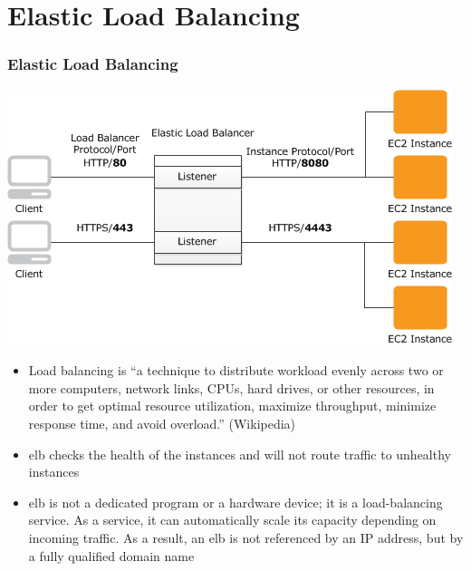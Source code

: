 \documentclass{beamer}
\begin{document}
\section{Elastic Load Balancing}
\begin{frame}
\frametitle{Elastic Load Balancing}
\includegraphics[width=0.75 \textwidth]{elb-listeners.png}
\begin{itemize}
\item Load balancing is ``a technique to distribute workload evenly across
two or more computers, network links, CPUs, hard drives, or other resources, in order
to get optimal resource utilization, maximize throughput, minimize response time, and
avoid overload.'' (Wikipedia)
\item  \acrfull{elb} checks the health of the
instances and will not route traffic to unhealthy instances
\item \acrshort{elb} is not a dedicated program or a hardware device; it is a load-balancing service. As
a service, it can automatically scale its capacity depending on incoming traffic. As a
result, an \acrshort{elb} is not referenced by an IP address, but by a fully qualified domain name
\end{itemize}
\end{frame}
\end{document}
